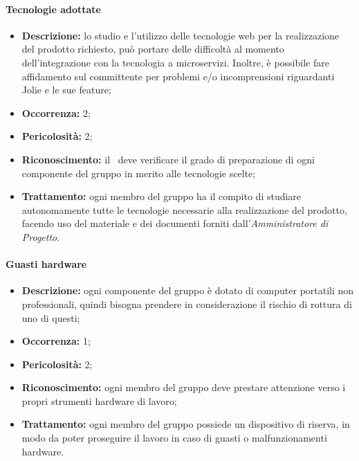 \paragraph{Tecnologie adottate}
\begin{itemize}
	\item \textbf{Descrizione:} lo studio e l'utilizzo delle tecnologie web per la realizzazione del prodotto richiesto, può portare delle difficoltà al momento dell'integrazione con la tecnologia a microservizi. Inoltre, è possibile fare affidamento sul committente per problemi e/o incomprensioni riguardanti Jolie e le sue feature;
	\item \textbf{Occorrenza:} 2;
	\item \textbf{Pericolosità:} 2;
	\item \textbf{Riconoscimento:} il \textit{\RdP}\ deve verificare il grado di preparazione di ogni componente del gruppo in merito alle tecnologie scelte;
	\item \textbf{Trattamento:} ogni membro del gruppo ha il compito di studiare autonomamente tutte le tecnologie necessarie alla realizzazione del prodotto, facendo uso del materiale e dei documenti forniti dall’\textit{Amministratore di Progetto}.
\end{itemize}

\paragraph{Guasti hardware}
\begin{itemize}
	\item \textbf{Descrizione:} ogni componente del gruppo è dotato di computer portatili non professionali, quindi bisogna prendere in considerazione il rischio di rottura di uno di questi;
	\item \textbf{Occorrenza:} 1;
	\item \textbf{Pericolosità:} 2;
	\item \textbf{Riconoscimento:} ogni membro del gruppo deve prestare attenzione verso i propri strumenti hardware di lavoro;
	\item \textbf{Trattamento:} ogni membro del gruppo possiede un dispositivo di riserva, in modo da poter proseguire il lavoro in caso di guasti o malfunzionamenti hardware.
\end{itemize}

